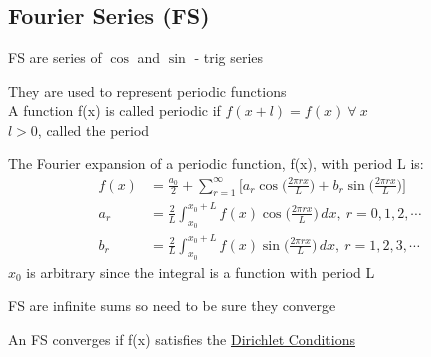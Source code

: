 \documentclass[a4paper, 11pt, normalem]{report}
\begin{document}
\chapter{}
\section{Fourier Series (FS)}
FS are series of $\cos$ and $\sin$ - trig series

They are used to represent periodic functions \\
A function f(x) is called periodic if $f(x + l) = f(x) ~\forall~ x$ \\
$l > 0$, called the period

The Fourier expansion of a periodic function, f(x), with period L is:
\begin{align*}
    f(x) &= \frac{a_0}{2} + \sum_{r = 1}^{\infty} \Bigg[a_r \cos\Big(\frac{2\pi rx}{L}\Big) + b_r \sin\Big(\frac{2\pi rx}{L}\Big)\Bigg] \\
    a_r &= \frac{2}{L} \int_{x_0}^{x_0 + L} f(x)\cos\Big(\frac{2\pi rx}{L}\Big)\,dx,~ r = 0,1,2,\cdots \\
    b_r &= \frac{2}{L} \int_{x_0}^{x_0 + L} f(x)\sin\Big(\frac{2\pi rx}{L}\Big)\,dx,~ r = 1,2,3,\cdots
\end{align*}
$x_0$ is arbitrary since the integral is a function with period L

FS are infinite sums so need to be sure they converge

An FS converges if f(x) satisfies the \underline{Dirichlet Conditions}
\end{document}
